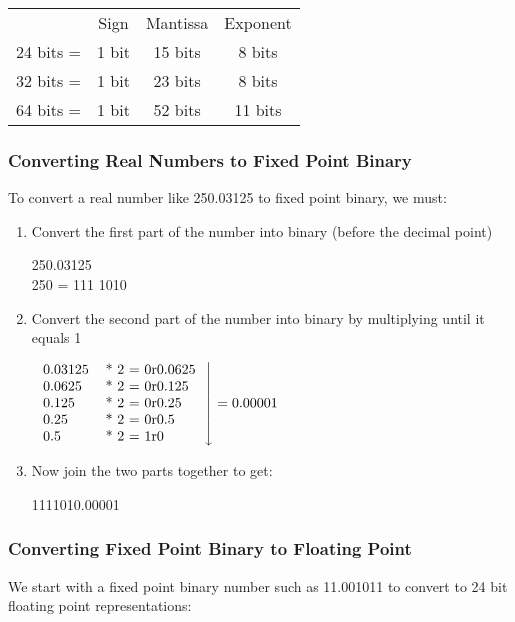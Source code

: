 \documentclass[a4paper, 12pt]{report}
\begin{document}
\begin{tabular}{cccc}
& Sign & Mantissa & Exponent \\
24 bits = & 1 bit & 15 bits & 8 bits \\
32 bits = & 1 bit & 23 bits & 8 bits \\
64 bits = & 1 bit & 52 bits & 11 bits \\
\end{tabular}

\subsubsection{Converting Real Numbers to Fixed Point Binary}

To convert a real number like 250.03125 to fixed point binary, we must: \\

\begin{enumerate}
\item Convert the first part of the number into binary (before the decimal point)

250.03125 \\
250 = 111 1010

\item Convert the second part of the number into binary by multiplying until it equals 1

$\left.
\begin{tabular}{ll}
0.03125 & * 2 = 0r0.0625 \\
0.0625 & * 2 = 0r0.125 \\
0.125 & * 2 = 0r0.25 \\
0.25 & * 2 = 0r0.5 \\
0.5 & * 2 = 1r0 \\
\end{tabular}
\right\downarrow
= 0.00001$

\item Now join the two parts together to get:

1111010.00001
\end{enumerate}

\subsubsection{Converting Fixed Point Binary to Floating Point}

We start with a fixed point binary number such as 11.001011 to convert to 24 bit floating point representations:  \\
\end{document}
